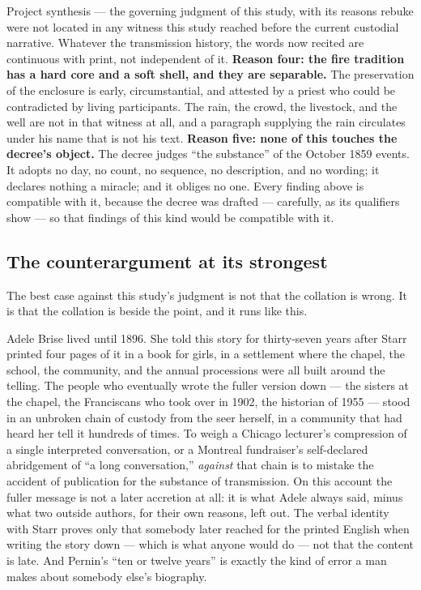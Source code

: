 \begin{judgmentbox}{Project synthesis --- the governing judgment of
this study, with its reasons}
rebuke were not located in any witness this study reached before the
current custodial narrative. Whatever the transmission history, the
words now recited are continuous with print, not independent of it.\jsep
\textbf{Reason four: the fire tradition has a hard core and a soft
shell, and they are separable.} The preservation of the enclosure is
early, circumstantial, and attested by a priest who could be
contradicted by living participants. The rain, the crowd, the
livestock, and the well are not in that witness at all, and a paragraph
supplying the rain circulates under his name that is not his
text.\jsep
\textbf{Reason five: none of this touches the decree's object.} The
decree judges ``the substance'' of the October 1859 events. It adopts
no day, no count, no sequence, no description, and no wording; it
declares nothing a miracle; and it obliges no one. Every finding above
is compatible with it, because the decree was drafted --- carefully, as
its qualifiers show --- so that findings of this kind would be
compatible with it.
\end{judgmentbox}

\subsection{The counterargument at its strongest}

The best case against this study's judgment is not that the collation
is wrong. It is that the collation is beside the point, and it runs
like this.

Adele Brise lived until 1896. She told this story for thirty-seven
years after Starr printed four pages of it in a book for girls, in a
settlement where the chapel, the school, the community, and the annual
processions were all built around the telling. The people who
eventually wrote the fuller version down --- the sisters at the chapel,
the Franciscans who took over in 1902, the historian of 1955 --- stood
in an unbroken chain of custody from the seer herself, in a community
that had heard her tell it hundreds of times. To weigh a Chicago
lecturer's compression of a single interpreted conversation, or a
Montreal fundraiser's self-declared abridgement of ``a long
conversation,'' \emph{against} that chain is to mistake the accident of
publication for the substance of transmission. On this account the
fuller message is not a later accretion at all: it is what Adele
always said, minus what two outside authors, for their own reasons,
left out. The verbal identity with Starr proves only that somebody
later reached for the printed English when writing the story down ---
which is what anyone would do --- not that the content is late. And
Pernin's ``ten or twelve years'' is exactly the kind of error a man
makes about somebody else's biography.

